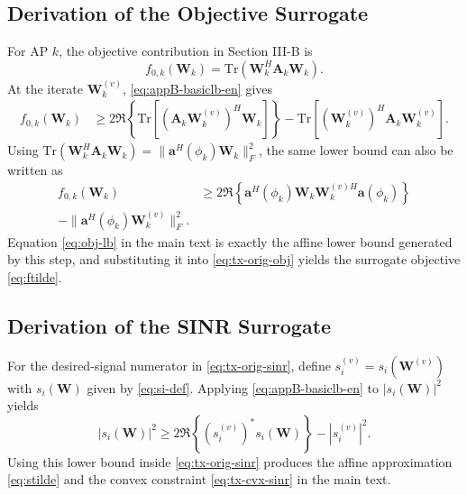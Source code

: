 \documentclass[conference,twocolumn,a4paper]{IEEEtran}
\begin{document}
\subsection{Derivation of the Objective Surrogate}
For AP $k$, the objective contribution in Section III-B is
\begin{equation}
f_{0,k}(\mathbf{W}_k)=\mathrm{Tr}(\mathbf{W}_k^H\mathbf{A}_k\mathbf{W}_k).
\end{equation}
At the iterate $\mathbf{W}_k^{(v)}$, \eqref{eq:appB-basiclb-en} gives
\begin{align}
f_{0,k}(\mathbf{W}_k)
&\ge 2\Re\!\left\{\mathrm{Tr}\!\left[(\mathbf{A}_k\mathbf{W}_k^{(v)})^H\mathbf{W}_k\right]\right\}
-\mathrm{Tr}\!\left[(\mathbf{W}_k^{(v)})^H\mathbf{A}_k\mathbf{W}_k^{(v)}\right].
\label{eq:appB-objlb-en}
\end{align}
Using $\mathrm{Tr}(\mathbf{W}_k^H\mathbf{A}_k\mathbf{W}_k)=\|\mathbf{a}^H(\phi_k)\mathbf{W}_k\|_F^2$, the same lower bound can also be written as
\begin{align}
f_{0,k}(\mathbf{W}_k)
&\ge 2\Re\!\left\{\mathbf{a}^H(\phi_k)\mathbf{W}_k\mathbf{W}_k^{(v)H}\mathbf{a}(\phi_k)\right\} \nonumber\\
-\|\mathbf{a}^H(\phi_k)\mathbf{W}_k^{(v)}\|_F^2.
\label{eq:appB-objlb-alt-en}
\end{align}
Equation \eqref{eq:obj-lb} in the main text is exactly the affine lower bound generated by this step, and substituting it into \eqref{eq:tx-orig-obj} yields the surrogate objective \eqref{eq:ftilde}.

\subsection{Derivation of the SINR Surrogate}
For the desired-signal numerator in \eqref{eq:tx-orig-sinr}, define $s_i^{(v)}=s_i(\mathbf{W}^{(v)})$ with $s_i(\mathbf{W})$ given by \eqref{eq:si-def}. Applying \eqref{eq:appB-basiclb-en} to $|s_i(\mathbf{W})|^2$ yields
\begin{equation}
|s_i(\mathbf{W})|^2\ge 2\Re\!\left\{\left(s_i^{(v)}\right)^*s_i(\mathbf{W})\right\}-|s_i^{(v)}|^2.
\label{eq:appB-signal-lb-en}
\end{equation}
Using this lower bound inside \eqref{eq:tx-orig-sinr} produces the affine approximation \eqref{eq:stilde} and the convex constraint \eqref{eq:tx-cvx-sinr} in the main text.
\end{document}

